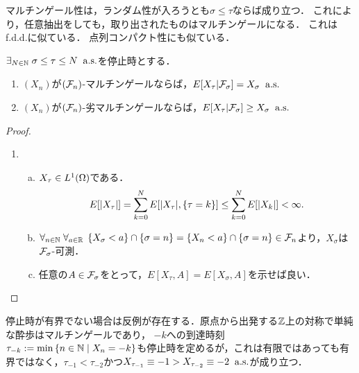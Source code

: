 \documentclass[uplatex,dvipdfmx]{jsreport}
\begin{document}
\begin{tcolorbox}[colframe=ForestGreen, colback=ForestGreen!10!white,breakable,colbacktitle=ForestGreen!40!white,coltitle=black,fonttitle=\bfseries\sffamily,
title=]
    マルチンゲール性は，ランダム性が入ろうとも$\sigma\le\tau$ならば成り立つ．
    これにより，任意抽出をしても，取り出されたものはマルチンゲールになる．
    これはf.d.d.に似ている．
    点列コンパクト性にも似ている．
\end{tcolorbox}

\begin{theorem}[有界停止時刻に関するマルチンゲール性]\label{thm-martingale-property-for-random-stopping-time}
    $\exists_{N\in\mathbb{N}}\;\sigma\le\tau\le N\;\;\mathrm{a.s.}$を停止時とする．
    \begin{enumerate}
        \item $(X_n)$が$(\mathcal{F}_n)$-マルチンゲールならば，$E[X_\tau|\mathcal{F}_\sigma]=X_\sigma\;\;\mathrm{a.s.}$
        \item $(X_n)$が$(\mathcal{F}_n)$-劣マルチンゲールならば，$E[X_\tau|\mathcal{F}_\sigma]\ge X_\sigma\;\;\mathrm{a.s.}$
    \end{enumerate}
\end{theorem}
\begin{proof}\mbox{}
    \begin{enumerate}
        \item \begin{enumerate}[(a)]
            \item $X_\tau\in L^1(\Omega)$である．
            \[E[\lvert X_\tau\rvert]=\sum^N_{k=0}E[\lvert X_\tau\rvert,\{\tau=k\}]\le\sum^N_{k=0}E[\lvert X_k\rvert]<\infty.\]
            \item $\forall_{n\in\mathbb{N}}\;\forall_{a\in\mathbb{R}}\;\left\{X_\sigma<a\right\}\cap\{\sigma=n\}=\{X_n<a\}\cap\{\sigma=n\}\in\mathcal{F}_n$より，$X_\sigma$は$\mathcal{F}_\sigma$-可測．
            \item 任意の$A\in\mathcal{F}_\sigma$をとって，$E[X_\tau,A]=E[X_\sigma,A]$を示せば良い．
        \end{enumerate}
    \end{enumerate}
\end{proof}
\begin{remark}[有界でない場合は極めて簡単な反例が存在する]
    停止時が有界でない場合は反例が存在する．原点から出発する$\mathbb{Z}$上の対称で単純な酔歩はマルチンゲールであり，
    $-k$への到達時刻$\tau_{-k}:=\min\left\{n\in\mathbb{N}\mid X_n=-k\right\}$も停止時を定めるが，これは有限ではあっても有界ではなく，$\tau_{-1}<\tau_{-2}$かつ$X_{\tau_{-1}}\equiv-1>X_{\tau_{-2}}\equiv-2\;\;\mathrm{a.s.}$が成り立つ．
\end{remark}
\end{document}
